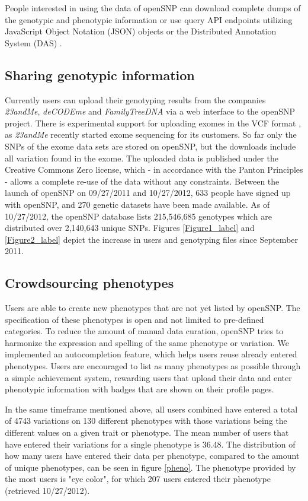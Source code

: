 \documentclass[10pt]{article}
\begin{document}
People interested in using the data of openSNP can download complete dumps of the genotypic and phenotypic information or use query API endpoints utilizing JavaScript Object Notation (JSON) objects or the Distributed Annotation System (DAS) \cite{Dowell2001}. 


\subsection*{Sharing genotypic information}
Currently users can upload their genotyping results from the companies \textit{23andMe}, \textit{deCODEme} and \textit{FamilyTreeDNA} via a web interface to the openSNP 
project. There is experimental support for uploading exomes in the VCF format \cite{Danecek01082011}, as \textit{23andMe} recently started exome sequencing for its customers. So far only the SNPs of the exome data sets are stored on openSNP, but the downloads include all variation found in the exome.
The uploaded data is published under the Creative Commons Zero license, 
which - in accordance with the Panton Principles \cite{10.1371/journal.pbio.1001195} - 
allows a complete re-use of the data without any constraints.
Between the launch of openSNP on 09/27/2011 and 10/27/2012, 633 people have signed 
up with openSNP, and 270 genetic datasets have been made available. As of 10/27/2012, the openSNP database lists 215,546,685 genotypes which are distributed over 2,140,643 unique SNPs.
Figures \ref{Figure1_label} and \ref{Figure2_label} depict the increase in users and genotyping files since September 2011.


\subsection*{Crowdsourcing phenotypes}
Users are able to create new phenotypes that are not yet 
listed by openSNP. 
The specification of these phenotypes is open and not limited 
to pre-defined categories. To reduce the amount of manual data curation, openSNP tries to harmonize 
the expression and spelling of the same phenotype or variation. We implemented an 
autocompletion feature, which helps users reuse already entered phenotypes.
Users are encouraged to list as many phenotypes as possible through a simple 
achievement system, rewarding users that upload their data and enter phenotypic 
information with badges that are shown on their profile pages.

In the same timeframe mentioned above, all users combined have 
entered a total of 4743 variations on 130 different phenotypes with those variations being 
the different values on a given trait or phenotype. The mean number of users that have entered their variations for a single phenotype 
is 36.48. The distribution of how many users have 
entered their data per phenotype, compared to the amount of unique phenotypes, can be seen in figure \ref{pheno}. The phenotype provided by the most users is "eye color", for which 207 users entered their phenotype (retrieved 10/27/2012). 
\end{document}
